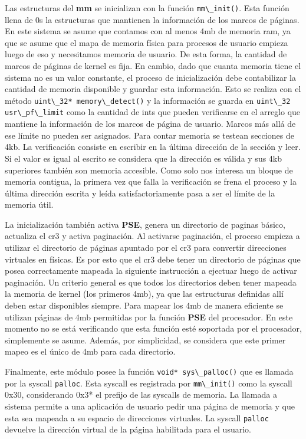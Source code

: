 \documentclass[a4paper]{article}
\newcommand{\func}[1]{\lstinline{#1}}
\begin{document}
Las estructuras del \textbf{mm} se inicializan con la función \func{mm\_init()}. Esta función llena de 0s la estructuras que mantienen la información de los marcos de páginas. En este sistema se asume que contamos con al menos 4mb de memoria ram, ya que se asume que el mapa de memoria física para procesos de usuario empieza luego de eso y necesitamos memoria de usuario. De esta forma, la cantidad de marcos de páginas de kernel es fija. En cambio, dado que cuanta memoria tiene el sistema no es un valor constante, el proceso de inicialización debe contabilizar la cantidad de memoria disponible y guardar esta información. Esto se realiza con el método \func{uint\_32* memory\_detect()} y la información se guarda en \func{uint\_32 usr\_pf\_limit} como la cantidad de ints que pueden verificarse en el arreglo que mantiene la información de los marcos de página de usuario. Marcos más allá de ese límite no pueden ser asignados. Para contar memoria se testean secciones de 4kb. La verificación consiste en escribir en la última dirección de la sección y leer. Si el valor es igual al escrito se considera que la dirección es válida y sus 4kb superiores también son memoria accesible. Como solo nos interesa un bloque de memoria contigua, la primera vez que falla la verificación se frena el proceso y la última dirección escrita y leída satisfactoriamente pasa a ser el límite de la memoria útil. 

La inicialización también activa \textbf{PSE}, genera un directorio de paginas básico, actualiza el cr3 y activa paginación. Al activarse paginación, el proceso empieza a utilizar el directorio de páginas apuntado por el cr3 para convertir direcciones virtuales en físicas. Es por esto que el cr3 debe tener un directorio de páginas que posea correctamente mapeada la siguiente instrucción a ejectuar luego de activar paginación. Un criterio general es que todos los directorios deben tener mapeada la memoria de kernel (los primeros 4mb), ya que las estructuras definidas allí deben estar disponibles siempre. Para mapear los 4mb de manera eficiente se utilizan páginas de 4mb permitidas por la función \textbf{PSE} del procesador. En este momento no se está verificando que esta función esté soportada por el procesador, simplemente se asume. Además, por simplicidad, se considera que este primer mapeo es el único de 4mb para cada directorio. 

Finalmente, este módulo posee la función \func{void* sys\_palloc()} que es llamada por la syscall \func{palloc}. Esta syscall es registrada por \func{mm\_init()} como la syscall 0x30, considerando 0x3* el prefijo de las syscalls de memoria. La llamada a sistema permite a una aplicación de usuario pedir una página de memoria y que esta sea mapeada a su espacio de direcciones virtuales. La syscall \func{palloc} devuelve la dirección virtual de la página habilitada para el usuario. 
\end{document}
